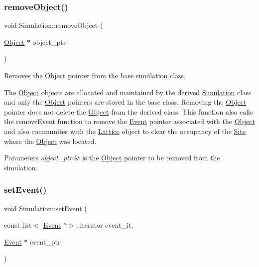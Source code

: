 \subsubsection{\texorpdfstring{remove\+Object()}{removeObject()}}
{\footnotesize\ttfamily void Simulation\+::remove\+Object (\begin{DoxyParamCaption}\item[{\hyperlink{class_object}{Object} $\ast$}]{object\+\_\+ptr }\end{DoxyParamCaption})\hspace{0.3cm}{\ttfamily [protected]}}



Removes the \hyperlink{class_object}{Object} pointer from the base simulation class. 

The \hyperlink{class_object}{Object} objects are allocated and maintained by the derived \hyperlink{class_simulation}{Simulation} class and only the \hyperlink{class_object}{Object} pointers are stored in the base class. Removing the \hyperlink{class_object}{Object} pointer does not delete the \hyperlink{class_object}{Object} from the derived class. This function also calls the remove\+Event function to remove the \hyperlink{class_event}{Event} pointer associated with the \hyperlink{class_object}{Object} and also communites with the \hyperlink{class_lattice}{Lattice} object to clear the occupancy of the \hyperlink{class_site}{Site} where the \hyperlink{class_object}{Object} was located. 
\begin{DoxyParams}{Parameters}
{\em object\+\_\+ptr} & is the \hyperlink{class_object}{Object} pointer to be removed from the simulation. \\
\hline
\end{DoxyParams}
\mbox{\label{class_simulation_a122928940c1301d71f19700b574f9e37}} 
\subsubsection{\texorpdfstring{set\+Event()}{setEvent()}}
{\footnotesize\ttfamily void Simulation\+::set\+Event (\begin{DoxyParamCaption}\item[{const list$<$ \hyperlink{class_event}{Event} $\ast$$>$\+::iterator}]{event\+\_\+it,  }\item[{\hyperlink{class_event}{Event} $\ast$}]{event\+\_\+ptr }\end{DoxyParamCaption})\hspace{0.3cm}{\ttfamily [protected]}}



